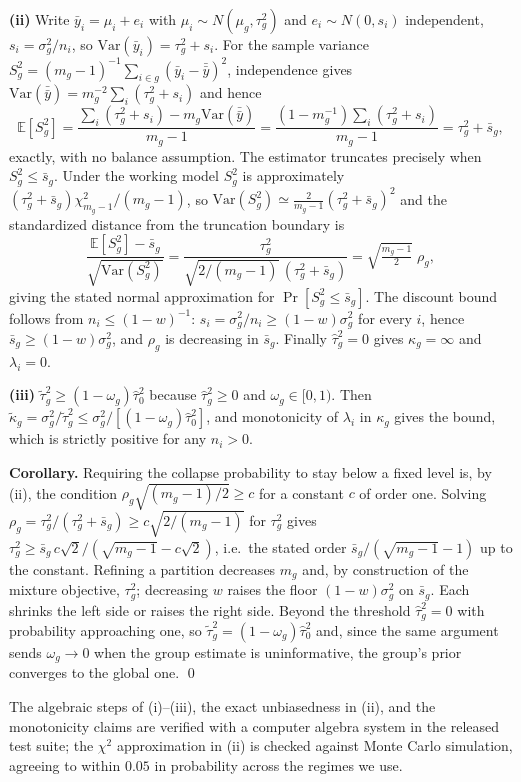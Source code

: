 \documentclass[twocolumn,10pt]{article}
\newcommand{\E}{\mathbb{E}}
\newcommand{\Var}{\mathrm{Var}}
\begin{document}
\textbf{(ii)} Write $\bar y_i=\mu_i+e_i$ with
$\mu_i\sim N(\mu_g,\tau_g^2)$ and $e_i\sim N(0,s_i)$ independent,
$s_i=\sigma_g^2/n_i$, so $\Var(\bar y_i)=\tau_g^2+s_i$. For the sample
variance $S_g^2=(m_g-1)^{-1}\sum_{i\in g}(\bar y_i-\bar{\bar y})^2$,
independence gives
$\Var(\bar{\bar y})=m_g^{-2}\sum_i(\tau_g^2+s_i)$ and hence
\[
\E[S_g^2]=\frac{\sum_i(\tau_g^2+s_i)-m_g\Var(\bar{\bar y})}{m_g-1}
=\frac{(1-m_g^{-1})\sum_i(\tau_g^2+s_i)}{m_g-1}
=\tau_g^2+\bar s_g ,
\]
exactly, with no balance assumption. The estimator truncates precisely
when $S_g^2\le\bar s_g$. Under the working model $S_g^2$ is
approximately $(\tau_g^2+\bar s_g)\chi^2_{m_g-1}/(m_g-1)$, so
$\Var(S_g^2)\simeq\frac{2}{m_g-1}(\tau_g^2+\bar s_g)^2$ and the
standardized distance from the truncation boundary is
\[
\frac{\E[S_g^2]-\bar s_g}{\sqrt{\Var(S_g^2)}}
=\frac{\tau_g^2}{\sqrt{2/(m_g-1)}\,(\tau_g^2+\bar s_g)}
=\sqrt{\tfrac{m_g-1}{2}}\;\rho_g ,
\]
giving the stated normal approximation for
$\Pr[S_g^2\le\bar s_g]$. The discount bound follows from
$n_i\le(1-w)^{-1}$: $s_i=\sigma_g^2/n_i\ge(1-w)\sigma_g^2$ for every
$i$, hence $\bar s_g\ge(1-w)\sigma_g^2$, and $\rho_g$ is decreasing in
$\bar s_g$. Finally $\hat\tau_g^2=0$ gives $\kappa_g=\infty$ and
$\lambda_i=0$.

\textbf{(iii)} $\tilde\tau_g^2\ge(1-\omega_g)\hat\tau_0^2$ because
$\hat\tau_g^2\ge0$ and $\omega_g\in[0,1)$. Then
$\tilde\kappa_g=\sigma_g^2/\tilde\tau_g^2\le
\sigma_g^2/[(1-\omega_g)\hat\tau_0^2]$, and monotonicity of
$\lambda_i$ in $\kappa_g$ gives the bound, which is strictly positive
for any $n_i>0$.

\textbf{Corollary.} Requiring the collapse probability to stay below a
fixed level is, by (ii), the condition $\rho_g\sqrt{(m_g-1)/2}\ge c$ for
a constant $c$ of order one. Solving
$\rho_g=\tau_g^2/(\tau_g^2+\bar s_g)\ge c\sqrt{2/(m_g-1)}$ for
$\tau_g^2$ gives
$\tau_g^2\ge\bar s_g\,c\sqrt{2}/(\sqrt{m_g-1}-c\sqrt2)$, i.e.\ the
stated order $\bar s_g/(\sqrt{m_g-1}-1)$ up to the constant. Refining a
partition decreases $m_g$ and, by construction of the mixture objective,
$\tau_g^2$; decreasing $w$ raises the floor $(1-w)\sigma_g^2$ on
$\bar s_g$. Each shrinks the left side or raises the right side. Beyond
the threshold $\hat\tau_g^2=0$ with probability approaching one, so
$\tilde\tau_g^2=(1-\omega_g)\hat\tau_0^2$ and, since the same argument
sends $\omega_g\to0$ when the group estimate is uninformative, the
group's prior converges to the global one. \qed

The algebraic steps of (i)--(iii), the exact unbiasedness in (ii), and
the monotonicity claims are verified with a computer algebra system in
the released test suite; the $\chi^2$ approximation in (ii) is checked
against Monte Carlo simulation, agreeing to within $0.05$ in probability
across the regimes we use.
\end{document}
